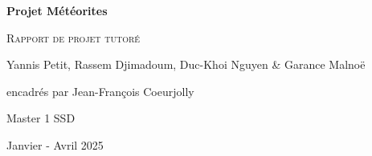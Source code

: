 \documentclass[12pt]{article}
\begin{document}
\begin{titlepage}
    \centering   
    {\huge\bfseries Projet Météorites\par}
    \vspace{1cm}
    {\scshape\Large Rapport de projet tutoré\par}
    \vspace{1.5cm}
    {\large Yannis Petit, Rassem Djimadoum, Duc-Khoi Nguyen \& Garance Malnoë\par
    encadrés par Jean-François Coeurjolly\par}
    \vspace{0.5cm}
    {\large Master 1 SSD\par}
    \vspace{0.5cm}
    {\large Janvier - Avril 2025\par}
    \vspace{3cm}
\end{titlepage}
\tableofcontents
\clearpage
{}
\end{document}
